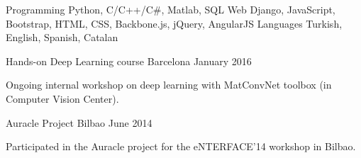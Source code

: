 

\begin{cvskills}
  \cvskill
    {Programming} %
    {Python, C/C++/C\#, Matlab, SQL} %
  \cvskill
    {Web} %
    {Django, JavaScript, Bootstrap, HTML, CSS, Backbone.js, jQuery, AngularJS} %
  \cvskill
    {Languages} %
    {Turkish, English, Spanish, Catalan} %
\end{cvskills}

\begin{cventries}
  \cventrynorole
    {Hands-on Deep Learning course} %
    {Barcelona} %
    {January 2016} %
    {
      \begin{cvitems} %
        \item {Ongoing internal workshop on deep learning with MatConvNet toolbox (in Computer Vision Center).}
      \end{cvitems}
    }
  \cventrynorole
    {Auracle Project} %
    {Bilbao} %
    {June 2014} %
    {
      \begin{cvitems} %
        \item {Participated in the Auracle project for the eNTERFACE'14 workshop in Bilbao.}
      \end{cvitems}
    }

\end{cventries}
